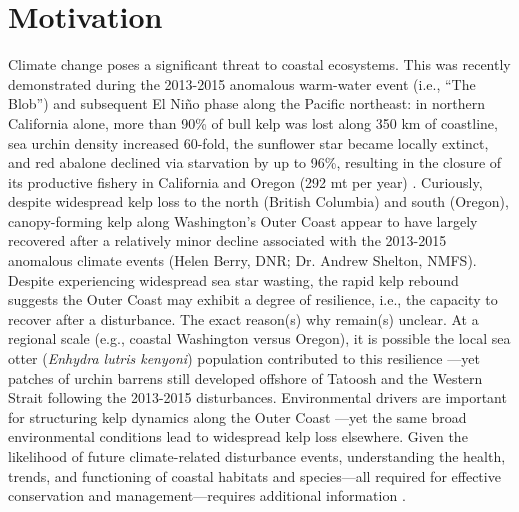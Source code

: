 \documentclass[11pt]{article}
\begin{document}
\section{Motivation}
\label{Motivation}
Climate change poses a significant threat to coastal ecosystems. 
This was recently demonstrated during the 2013-2015 anomalous 
warm-water event (i.e., “The Blob”) and subsequent El Niño phase along 
the Pacific northeast: 
in northern California alone, 
more than 90\% of bull kelp was lost along 350 km of coastline, 
sea urchin density increased 60-fold, 
the sunflower star became locally extinct, 
and red abalone declined via starvation by up to 96\%, resulting in the 
closure of its productive fishery in California and Oregon (292 mt per 
year) \cite{Rogers-Bennett2019a, Gravem2021}.
Curiously, despite widespread kelp loss to the north (British Columbia) 
and south (Oregon), canopy-forming kelp along Washington's Outer Coast 
appear to have largely recovered after a relatively minor decline 
associated with the 2013-2015 anomalous climate events (Helen Berry, 
DNR; Dr. Andrew Shelton, NMFS). 
Despite experiencing widespread sea star wasting, the rapid kelp 
rebound suggests the Outer Coast may exhibit a degree of resilience, 
i.e., the capacity to recover after a disturbance.
The exact reason(s) why remain(s) unclear. 
At a regional scale (e.g., coastal Washington versus Oregon), it is 
possible the local sea otter (\textit{Enhydra lutris kenyoni}) 
population contributed to this resilience \cite{Rasher2020, Shelton2018}---yet patches of urchin barrens still developed offshore of Tatoosh and the Western Strait following the 2013-2015 disturbances. 
Environmental drivers are important for structuring kelp dynamics along 
the Outer Coast \cite{Pfister2018}---yet the same broad environmental 
conditions lead to widespread kelp loss elsewhere. 
Given the likelihood of future climate-related disturbance events, understanding the health, trends, and functioning of coastal habitats and species---all required for 
effective conservation and management---requires additional information \cite{Hughes2017}. 





\end{document}
